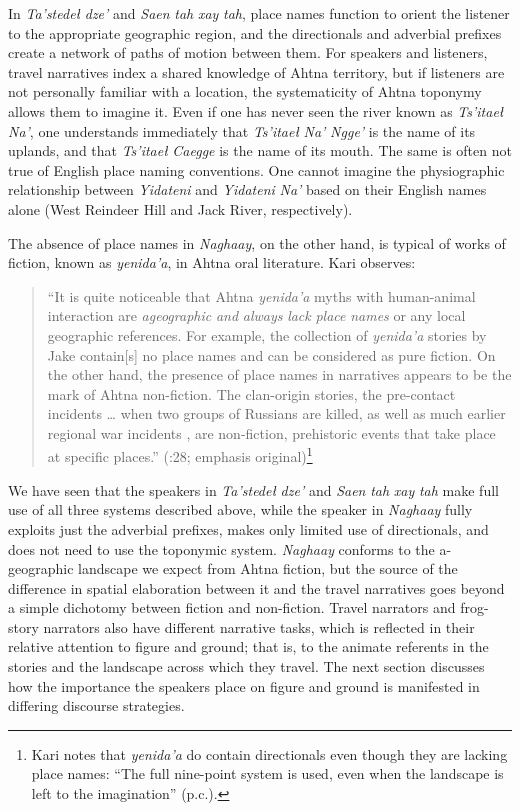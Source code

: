 In \textit{Ta’stedeł} \textit{dze’} and \textit{Saen} \textit{tah} \textit{xay} \textit{tah}, place names function to orient the listener to the appropriate geographic region, and the directionals and adverbial prefixes create a network of paths of motion between them. For speakers and listeners, travel narratives index a shared knowledge of Ahtna territory, but if listeners are not personally familiar with a location, the systematicity of Ahtna toponymy allows them to imagine it. Even if one has never seen the river known as \textit{Ts’itaeł} \textit{Na’}, one understands immediately that \textit{Ts’itaeł} \textit{Na’} \textit{Ngge’} is the name of its uplands, and that \textit{Ts’itaeł} \textit{Caegge} is the name of its mouth. The same is often not true of English place naming conventions. One cannot imagine the physiographic relationship between \textit{Yidateni} and \textit{Yidateni} \textit{Na’} based on their English names alone (West Reindeer Hill and Jack River, respectively).

The absence of place names in \textit{Naghaay}, on the other hand, is typical of works of fiction, known as \textit{yenida’a}, in Ahtna oral literature. Kari observes:

\begin{quote}
``It is quite noticeable that Ahtna \textit{yenida’a} myths with human-animal interaction are \textit{ageographic} \textit{and} \textit{always} \textit{lack} \textit{place} \textit{names} or any local geographic references. For example, the collection of \textit{yenida’a} stories by Jake \citet{Tansy1982} contain[s] no place names and can be considered as pure fiction. On the other hand, the presence of place names in narratives appears to be the mark of Ahtna non-fiction. The clan-origin stories, the pre-contact incidents … when two groups of Russians are killed, as well as much earlier regional war incidents \citep{Kari1986}, are non-fiction, prehistoric events that take place at specific places.'' (\citealt{Kari2008}:28; emphasis original)\footnote{Kari notes that \textit{yenida’a} do contain directionals even though they are lacking place names: “The full nine-point system is used, even when the landscape is left to the imagination” (p.c.).}
\end{quote}

We have seen that the speakers in \textit{Ta’stedeł} \textit{dze’} and \textit{Saen} \textit{tah} \textit{xay} \textit{tah} make full use of all three systems described above, while the speaker in \textit{Naghaay} fully exploits just the adverbial prefixes, makes only limited use of directionals, and does not need to use the toponymic system. \textit{Naghaay} conforms to the a-geographic landscape we expect from Ahtna fiction, but the source of the difference in spatial elaboration between it and the travel narratives goes beyond a simple dichotomy between fiction and non-fiction. Travel narrators and frog-story narrators also have different narrative tasks, which is reflected in their relative attention to figure and ground; that is, to the animate referents in the stories and the landscape across which they travel. The next section discusses how the importance the speakers place on figure and ground is manifested in differing discourse strategies.

